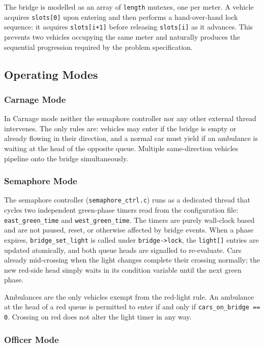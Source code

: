 \documentclass[12pt]{article}
\begin{document}
The bridge is modelled as an array of \texttt{length} mutexes, one per
meter. A vehicle acquires \texttt{slots[0]} upon entering and then performs
a hand-over-hand lock sequence: it acquires \texttt{slots[i+1]} before
releasing \texttt{slots[i]} as it advances. This prevents two vehicles
occupying the same meter and naturally produces the sequential progression
required by the problem specification.

\subsection{Operating Modes}

\subsubsection{Carnage Mode}

In Carnage mode neither the semaphore controller nor any other external
thread intervenes. The only rules are: vehicles may enter if the bridge is
empty or already flowing in their direction, and a normal car must yield if
an ambulance is waiting at the head of the opposite queue. Multiple
same-direction vehicles pipeline onto the bridge simultaneously.

\subsubsection{Semaphore Mode}

The semaphore controller (\texttt{semaphore\_ctrl.c}) runs as a dedicated
thread that cycles two independent green-phase timers read from the
configuration file: \texttt{east\_green\_time} and
\texttt{west\_green\_time}. The timers are purely wall-clock based and are
not paused, reset, or otherwise affected by bridge events. When a phase
expires, \texttt{bridge\_set\_light} is called under \texttt{bridge->lock},
the \texttt{light[]} entries are updated atomically, and both queue heads
are signalled to re-evaluate. Cars already mid-crossing when the light
changes complete their crossing normally; the new red-side head simply
waits in its condition variable until the next green phase.

Ambulances are the only vehicles exempt from the red-light rule. An
ambulance at the head of a red queue is permitted to enter if and only if
\texttt{cars\_on\_bridge == 0}. Crossing on red does not alter the light
timer in any way.

\subsubsection{Officer Mode}
\end{document}
